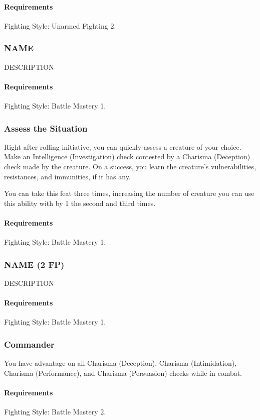    \paragraph{Requirements} Fighting Style: Unarmed Fighting 2.
\subsubsection{NAME} \label{feat::name}
    DESCRIPTION
    \paragraph{Requirements} Fighting Style: Battle Mastery 1.
\subsubsection{Assess the Situation} \label{feat::assessthesituation}
    Right after rolling initiative, you can quickly assess a creature of your choice.
    Make an Intelligence (Investigation) check contested by a Charisma (Deception) check made by the creature.
    On a success, you learn the creature's vulnerabilities, resistances, and immunities, if it has any.

    You can take this feat three times, increasing the number of creature you can use this ability with by 1 the second and third times.
    \paragraph{Requirements} Fighting Style: Battle Mastery 1.
\subsubsection{NAME (2 FP)} \label{feat::name}
    DESCRIPTION
    \paragraph{Requirements} Fighting Style: Battle Mastery 1.
\subsubsection{Commander} \label{feat::commander}
    You have advantage on all Charisma (Deception), Charisma (Intimidation), Charisma (Performance), and Charisma (Persuasion) checks while in combat.
    \paragraph{Requirements} Fighting Style: Battle Mastery 2.
